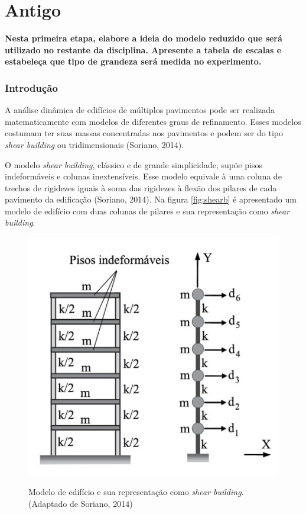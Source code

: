 \pagebreak \part{Antigo}

\textbf{Nesta primeira etapa, elabore a ideia do modelo reduzido que será utilizado no restante da disciplina. Apresente a tabela de escalas e estabeleça que tipo de grandeza será medida no experimento.}

\section{Introdução}

A análise dinâmica de edifícios de múltiplos pavimentos pode ser realizada matematicamente com modelos de diferentes graus de refinamento. Esses modelos costumam ter suas massas concentradas nos pavimentos e podem ser do tipo \textit{shear building} ou tridimensionais (Soriano, 2014).

O modelo \textit{shear building}, clássico e de grande simplicidade, supõe pisos indeformáveis e colunas inextensíveis. Esse modelo equivale à uma coluna de trechos de rigidezes iguais à soma das rigidezes à flexão dos pilares de cada pavimento da edificação (Soriano, 2014). Na figura \ref{fig:shearb} é apresentado um modelo de edifício com duas colunas de pilares e sua representação como \textit{shear building}.


\begin{figure}
	\centering
	\caption{Modelo de edifício e sua representação como \textit{shear building}.\\ \small{(Adaptado de Soriano, 2014)}}
	\includegraphics[scale=0.39]{../Images/ShearBuilding}
	\label{fig:shearb2}
\end{figure}



